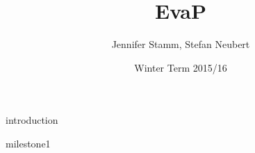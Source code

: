 \documentclass[12pt,a4paper]{scrartcl}
\title{EvaP}
\author{Jennifer Stamm, Stefan Neubert}
\date{Winter Term 2015/16}
\begin{document}
	\maketitle
	
	\tableofcontents
	
	\clearpage
	
	{introduction}

	{milestone1}
\end{document}
